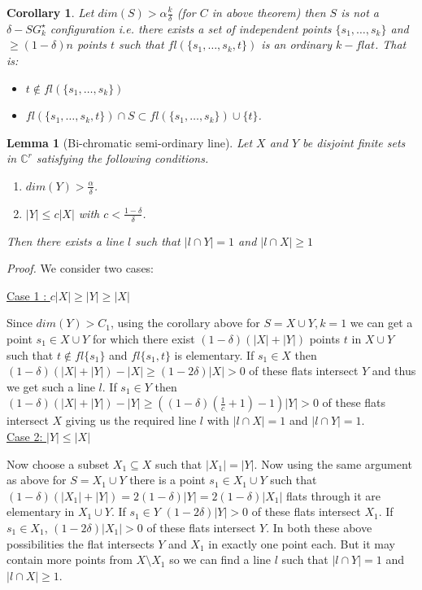 \documentclass[12pt]{caltech_thesis}
\theoremstyle{plain}
\newtheorem{corollary}{Corollary}
\newtheorem{lemma}{Lemma}
\theoremstyle{definition}
\newcommand{\C}{\mathbb{C}}
\begin{document}
\begin{corollary} \label{elementary}
 Let $dim(S)> \alpha\frac{k}{\delta}$ (for $C$ in above theorem) then $S$ is not a $\delta-SG_k^{\star}$
configuration i.e. there exists a set of independent points $\{s_1,\ldots,s_k\}$
 and $\geq (1-\delta)n$ points $t$ such that $fl(\{s_1,\ldots,s_k,t\})$ is an
ordinary $k - flat$. That is:
 \begin{itemize}
  \item $t\notin fl(\{s_1,\ldots,s_k\})$
  \item $fl(\{s_1,\ldots,s_k,t\}) \cap S \subset fl(\{s_1,\ldots,s_k\})\cup \{t\}$.
 \end{itemize}

\end{corollary}

\begin{lemma}[Bi-chromatic semi-ordinary line]\label{lemma:bichromatic}
 Let $X$ and $Y$ be disjoint finite sets in $\C^r$ satisfying the following
conditions.
\begin{enumerate}
\item $dim(Y)>\frac{\alpha}{\delta}$.
\item $|Y|\leq  c|X|$ with $c < \frac{1-\delta}{\delta}$.
\end{enumerate}
Then there exists a line $l$ such that $|l\cap Y|=1$ and $|l\cap X|\geq 1$
\end{lemma}


\emph{Proof.}
We consider two cases:

\underline{Case 1 : $c|X|\geq |Y|\geq |X|$}

Since $dim(Y)>C_1$, using the corollary above for $S=X\cup Y, k=1$ we can get a
point $s_1 \in X\cup Y$ for which there exist $(1-\delta)(|X|+|Y|)$ points $t$
in $X\cup Y$
such that $t\notin fl\{s_1\}$ and $fl\{s_1,t\}$ is elementary.
If $s_1\in X$ then $(1-\delta)(|X|+|Y|)-|X| \geq (1-2\delta)|X|>0$ of these
flats intersect $Y$ and thus we get such a line $l$. If $s_1\in Y$ then
$(1-\delta)(|X|+|Y|)-|Y| \geq ((1-\delta)(\frac{1}{c}+1) -1)|Y| >0$ of these
flats intersect $X$ giving us the required line $l$ with $|l\cap X|=1$ and
$|l\cap Y|=1$.\\

\underline{Case 2: $|Y|\leq |X|$}

 Now choose a subset $X_1\subseteq X$ such that $|X_1|=|Y|$. Now using the same
argument
as above for $S = X_1\cup Y$ there is a point $s_1\in X_1\cup Y$ such that
$(1-\delta) (|X_1|+|Y|)= 2(1-\delta) |Y| = 2(1-\delta) |X_1|$ flats through
it are elementary in $X_1\cup Y$. If $s_1\in Y$ $(1-2\delta)|Y|>0$ of these
flats intersect $X_1$. If $s_1\in X_1$,
$(1-2\delta)|X_1| >0$ of these flats intersect $Y$. In both these above
possibilities the flat intersects $Y$ and $X_1$ in
exactly one point each. But it may contain more points from $X\setminus X_1$ so
we can find a line $l$ such that $|l\cap Y|=1$
and $|l\cap X|\geq 1$.
\end{document}
